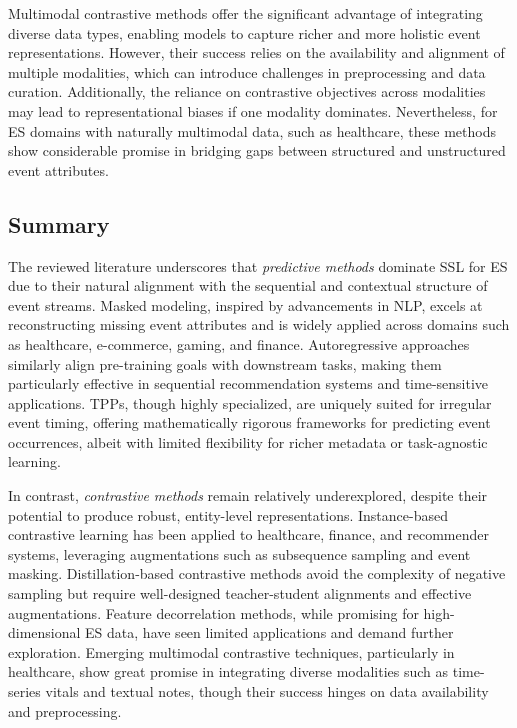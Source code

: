 \documentclass[twoside,11pt]{article}
\begin{document}
Multimodal contrastive methods offer the significant advantage of integrating diverse data types, enabling models to capture richer and more holistic event representations. However, their success relies on the availability and alignment of multiple modalities, which can introduce challenges in preprocessing and data curation. Additionally, the reliance on contrastive objectives across modalities may lead to representational biases if one modality dominates. Nevertheless, for ES domains with naturally multimodal data, such as healthcare, these methods show considerable promise in bridging gaps between structured and unstructured event attributes.

\subsection{Summary}
\label{subsec:ssl-summary}

The reviewed literature underscores that \textit{predictive methods} dominate SSL for ES due to their natural alignment with the sequential and contextual structure of event streams. Masked modeling, inspired by advancements in NLP, excels at reconstructing missing event attributes and is widely applied across domains such as healthcare, e-commerce, gaming, and finance. Autoregressive approaches similarly align pre-training goals with downstream tasks, making them particularly effective in sequential recommendation systems and time-sensitive applications. TPPs, though highly specialized, are uniquely suited for irregular event timing, offering mathematically rigorous frameworks for predicting event occurrences, albeit with limited flexibility for richer metadata or task-agnostic learning.

In contrast, \textit{contrastive methods} remain relatively underexplored, despite their potential to produce robust, entity-level representations. Instance-based contrastive learning has been applied to healthcare, finance, and recommender systems, leveraging augmentations such as subsequence sampling and event masking. Distillation-based contrastive methods avoid the complexity of negative sampling but require well-designed teacher-student alignments and effective augmentations. Feature decorrelation methods, while promising for high-dimensional ES data, have seen limited applications and demand further exploration. Emerging multimodal contrastive techniques, particularly in healthcare, show great promise in integrating diverse modalities such as time-series vitals and textual notes, though their success hinges on data availability and preprocessing.
\end{document}
